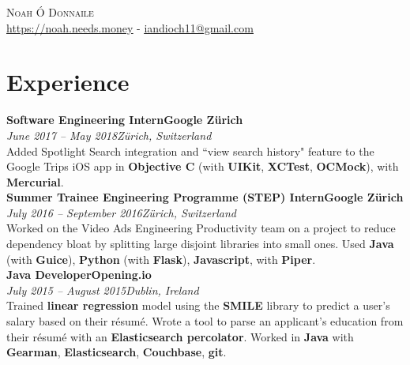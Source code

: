\documentclass[a4paper, oneside, final]{scrartcl}
\newcommand{\nasc}[2]{\href{#1}{\color{blue}\setulcolor{blue}\ul{#2}}}
\newcommand{\rawnasc}[1]{\nasc{#1}{#1}}
\newcommand{\bearna}[0]{\vspace{2.25mm}\\}
\newcommand{\fmtdate}[1]{\textit{#1}}
\newcommand{\fmtaddress}[1]{\textit{#1}}
\newcommand{\fmtjobtitle}[1]{\textbf{#1}}
\newcommand{\fmtskill}[1]{\textbf{#1}}
\begin{document}
 
\begin{center}
\textsc{\Huge{Noah Ó Donnaile}}
\bearna
\rawnasc{https://noah.needs.money} - 
\nasc{mailto:iandioch11+cv@gmail.com}{iandioch11@gmail.com}\\
\end{center}

\section{Experience}
\fmtjobtitle{Software Engineering Intern\hfill Google Zürich}\\
\fmtdate{June 2017 -- May 2018}\hfill\fmtaddress{Zürich, Switzerland}\\
Added Spotlight Search integration and ``view search history" feature to the Google Trips iOS app in \fmtskill{Objective C} (with \fmtskill{UIKit}, \fmtskill{XCTest}, \fmtskill{OCMock}), with \fmtskill{Mercurial}.
\bearna
\fmtjobtitle{Summer Trainee Engineering Programme (STEP) Intern\hfill Google Zürich}\\
\fmtdate{July 2016 -- September 2016}\hfill\fmtaddress{Zürich, Switzerland}\\
Worked on the Video Ads Engineering Productivity team on a project to reduce dependency bloat by splitting large disjoint libraries into small ones. Used \fmtskill{Java} (with \fmtskill{Guice}), \fmtskill{Python} (with \fmtskill{Flask}), \fmtskill{Javascript}, with \fmtskill{Piper}.
\bearna
\fmtjobtitle{Java Developer\hfill Opening.io}\\
\fmtdate{July 2015 -- August 2015}\hfill\fmtaddress{Dublin, Ireland}\\
Trained \fmtskill{linear regression} model using the \fmtskill{SMILE} library to predict a user’s salary based on their résumé. Wrote a tool to parse an applicant's education from their résumé with an \fmtskill{Elasticsearch percolator}. Worked in \fmtskill{Java} with \fmtskill{Gearman}, \fmtskill{Elasticsearch}, \fmtskill{Couchbase}, \fmtskill{git}.
\bearna
{}
\end{document}
